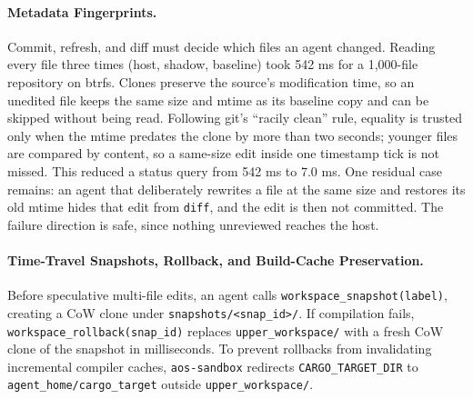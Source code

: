 \documentclass[10pt,twocolumn]{article}
\begin{document}
\paragraph{Metadata Fingerprints.} Commit, refresh, and diff must decide which files an agent changed. Reading every file three times (host, shadow, baseline) took 542 ms for a 1,000-file repository on btrfs. Clones preserve the source's modification time, so an unedited file keeps the same size and mtime as its baseline copy and can be skipped without being read. Following git's ``racily clean'' rule, equality is trusted only when the mtime predates the clone by more than two seconds; younger files are compared by content, so a same-size edit inside one timestamp tick is not missed. This reduced a status query from 542 ms to 7.0 ms. One residual case remains: an agent that deliberately rewrites a file at the same size and restores its old mtime hides that edit from \texttt{diff}, and the edit is then not committed. The failure direction is safe, since nothing unreviewed reaches the host.

\paragraph{Time-Travel Snapshots, Rollback, and Build-Cache Preservation.} Before speculative multi-file edits, an agent calls \texttt{workspace\_snapshot(label)}, creating a CoW clone under \texttt{snapshots/<snap\_id>/}. If compilation fails, \texttt{workspace\_rollback(snap\_id)} replaces \texttt{upper\_workspace/} with a fresh CoW clone of the snapshot in milliseconds. To prevent rollbacks from invalidating incremental compiler caches, \texttt{aos-sandbox} redirects \texttt{CARGO\_TARGET\_DIR} to \texttt{agent\_home/cargo\_target} outside \texttt{upper\_workspace/}.
\end{document}

